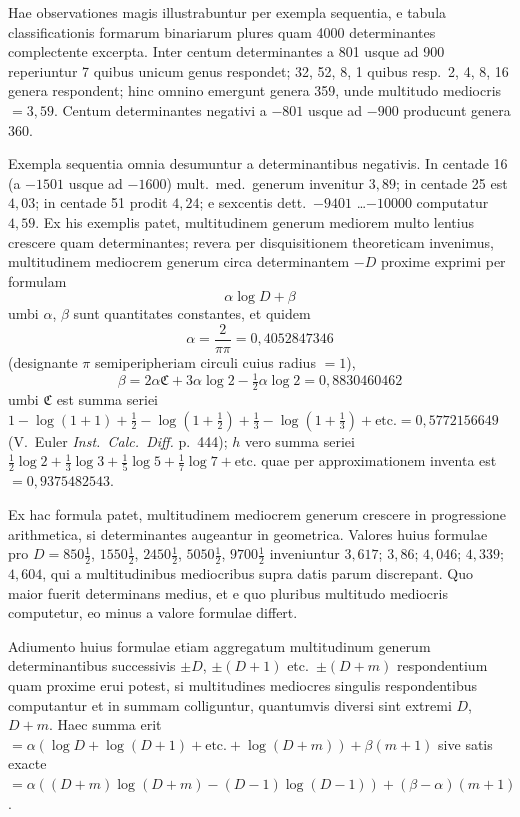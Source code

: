 \documentclass[12pt,a4paper]{article}
\theoremstyle{plain}
\theoremstyle{definition}
\theoremstyle{remark}
\begin{document}
Hae observationes magis illustrabuntur per exempla sequentia, e tabula classificationis formarum binariarum plures quam 4000 determinantes complectente excerpta. Inter centum determinantes a 801 usque ad 900 reperiuntur 7 quibus unicum genus respondet; 32, 52, 8, 1 quibus resp.~2, 4, 8, 16 genera respondent; hinc omnino emergunt genera 359, unde multitudo mediocris $= 3{,}59$. Centum determinantes negativi a $-801$ usque ad $-900$ producunt genera 360.

Exempla sequentia omnia desumuntur a determinantibus negativis. In centade 16 (a $-1501$ usque ad $-1600$) mult.~med.~generum invenitur $3{,}89$; in centade 25 est $4{,}03$; in centade 51 prodit $4{,}24$; e sexcentis dett.~$-9401$ \ldots $-10000$ computatur $4{,}59$. Ex his exemplis patet, multitudinem generum mediorem multo lentius crescere quam determinantes; revera per disquisitionem theoreticam invenimus, multitudinem mediocrem generum circa determinantem $-D$ proxime exprimi per formulam
\[
\alpha\log D + \beta
\]
umbi $\alpha$, $\beta$ sunt quantitates constantes, et quidem
\[
\alpha = \frac{2}{\pi\pi} = 0{,}4052847346
\]
(designante $\pi$ semiperipheriam circuli cuius radius $= 1$),
\[
\beta = 2\alpha\mathfrak{C} + 3\alpha\log 2 - \tfrac{1}{2}\alpha\log 2 = 0{,}8830460462
\]
umbi $\mathfrak{C}$ est summa seriei $1 - \log(1+1) + \tfrac{1}{2} - \log(1+\tfrac{1}{2}) + \tfrac{1}{3} - \log(1+\tfrac{1}{3}) + \text{etc.} = 0{,}5772156649$ (V.~Euler \textit{Inst.~Calc.~Diff.} p.~444); $h$ vero summa seriei $\tfrac{1}{2}\log 2 + \tfrac{1}{3}\log 3 + \tfrac{1}{5}\log 5 + \tfrac{1}{7}\log 7 + \text{etc.}$ quae per approximationem inventa est $= 0{,}9375482543$.

Ex hac formula patet, multitudinem mediocrem generum crescere in progressione arithmetica, si determinantes augeantur in geometrica. Valores huius formulae pro $D = 850\tfrac{1}{2}$, $1550\tfrac{1}{2}$, $2450\tfrac{1}{2}$, $5050\tfrac{1}{2}$, $9700\tfrac{1}{2}$ inveniuntur $3{,}617$; $3{,}86$; $4{,}046$; $4{,}339$; $4{,}604$, qui a multitudinibus mediocribus supra datis parum discrepant. Quo maior fuerit determinans medius, et e quo pluribus multitudo mediocris computetur, eo minus a valore formulae differt.

Adiumento huius formulae etiam aggregatum multitudinum generum determinantibus successivis $\pm D$, $\pm(D+1)$ etc.~$\pm(D+m)$ respondentium quam proxime erui potest, si multitudines mediocres singulis respondentibus computantur et in summam colliguntur, quantumvis diversi sint extremi $D$, $D+m$. Haec summa erit $= \alpha(\log D + \log(D+1) + \text{etc.} + \log(D+m)) + \beta(m+1)$ sive satis exacte $= \alpha((D+m)\log(D+m) - (D-1)\log(D-1)) + (\beta - \alpha)(m+1)$.
\end{document}
